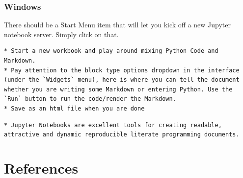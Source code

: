 \documentclass[
]{book}
\newenvironment{task}
{ \begin{tcolorbox}[title=For you to do,title filled] }
{  \end{tcolorbox} }
\newenvironment{roundup}
{ \begin{tcolorbox}[colbacktitle=yellow!50!white,
title=Round Up,coltitle=black,
fonttitle=\bfseries] }
{  \end{tcolorbox} }
\begin{document}
\hypertarget{windows-1}{%
\subsection{Windows}\label{windows-1}}

There should be a Start Menu item that will let you kick off a new Jupyter notebook server. Simply click on that.

\begin{task}
\begin{verbatim}
* Start a new workbook and play around mixing Python Code and Markdown.
* Pay attention to the block type options dropdown in the interface (under the `Widgets` menu), here is where you can tell the document whether you are writing some Markdown or entering Python. Use the `Run` button to run the code/render the Markdown.  
* Save as an html file when you are done
\end{verbatim}
\end{task}

\begin{roundup}
\begin{verbatim}
* Jupyter Notebooks are excellent tools for creating readable, attractive and dynamic reproducible literate programming documents.
\end{verbatim}
\end{roundup}

\hypertarget{references}{%
\chapter{References}\label{references}}

  
\end{document}

